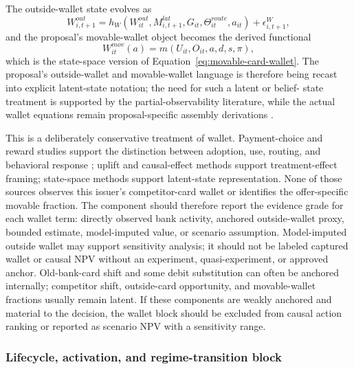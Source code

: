 \documentclass[11pt]{article}
\newcommand{\1}{\mathbf{1}}
\begin{document}
The outside-wallet state evolves as
\begin{equation}
  W^{out}_{i,t+1}
  =
  h_W(W^{out}_{it},M^{lat}_{i,t+1},G_{it},\Theta^{route}_{it},a_{it})
  + \epsilon^W_{i,t+1},
  \label{eq:ss-outside-wallet-transition}
\end{equation}
and the proposal's movable-wallet object becomes the derived functional
\begin{equation}
  W^{mov}_{it}(a)
  =
  m(U_{it},O_{it},a,d,s,\pi),
  \label{eq:ss-movable-wallet}
\end{equation}
which is the state-space version of Equation~\eqref{eq:movable-card-wallet}.
The proposal's outside-wallet and movable-wallet language is therefore being
recast into explicit latent-state notation; the need for such a latent or belief-
state treatment is supported by the partial-observability literature, while the
actual wallet equations remain proposal-specific assembly derivations
\citep{smallwood1973pomdp,kaelbling1998pomdp}.

This is a deliberately conservative treatment of wallet. Payment-choice and
reward studies support the distinction between adoption, use, routing, and
behavioral response \citep{koulayev2012payment,prelec2001creditcard,
agarwal2010rewards}; uplift and causal-effect methods support treatment-effect
framing; state-space methods support latent-state representation. None of those
sources observes this issuer's competitor-card wallet or identifies the
offer-specific movable fraction. The component should therefore report the
evidence grade for each wallet term: directly observed bank activity, anchored
outside-wallet proxy, bounded estimate, model-imputed value, or scenario
assumption. Model-imputed outside wallet may support sensitivity analysis; it
should not be labeled captured wallet or causal NPV without an experiment,
quasi-experiment, or approved anchor.
Old-bank-card shift and some debit substitution can often be anchored
internally; competitor shift, outside-card opportunity, and movable-wallet
fractions usually remain latent. If these components are weakly anchored and
material to the decision, the wallet block should be excluded from causal action
ranking or reported as scenario NPV with a sensitivity range.

\subsubsection{Lifecycle, activation, and regime-transition block}
\label{subsec:state-space-lifecycle-block}
\end{document}
